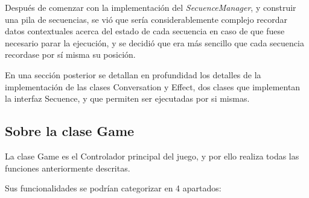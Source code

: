 Después de comenzar con la implementación del \textit{SecuenceManager}, y construir una pila de secuencias, se vió que sería considerablemente complejo recordar datos contextuales acerca del estado de cada secuencia en caso de que fuese necesario parar la ejecución, y se decidió que era más sencillo que cada secuencia recordase por sí misma su posición.

En una sección posterior se detallan en profundidad los detalles de la implementación de las clases Conversation y Effect, dos clases que implementan la interfaz Secuence, y que permiten ser ejecutadas por si mismas.

\subsection{Sobre la clase Game}
\label{gameit1}

La clase Game es el Controlador principal del juego, y por ello realiza todas las funciones anteriormente descritas.

Sus funcionalidades se podrían categorizar en 4 apartados:

